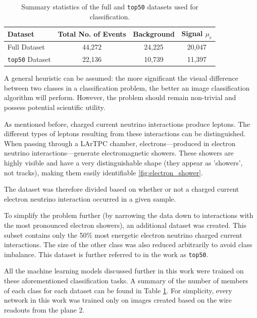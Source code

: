 \documentclass{pracalicmgr}
\begin{document}
\begin{table}[H]
    \centering
    \caption{Summary statistics of the full and \texttt{top50} datasets used for classification.}
    \label{tab:dataset_stats}
    \begin{tabular}{lccc}
        \toprule
        \textbf{Dataset} & \textbf{Total No. of Events} & \textbf{Background} & \textbf{Signal $\mu_e$ } \\
        \midrule
        Full Dataset     & 44,272                 & 24,225 & 20,047 \\
        \texttt{top50} Dataset & 22,136                 & 10,739 & 11,397 \\
        \bottomrule
    \end{tabular}
\end{table}

A general heuristic can be assumed: the more significant the visual difference between two classes in a classification problem, the better an image classification algorithm will perform. However, the problem should remain non-trivial and possess potential scientific utility.

As mentioned before, charged current neutrino interactions produce leptons. The different types of leptons resulting from these interactions can be distinguished. When passing through a LArTPC chamber, electrons—produced in electron neutrino interactions—generate electromagnetic showers. These showers are highly visible and have a very distinguishable shape (they appear as 'showers', not tracks), making them easily identifiable \ref{fig:electron_shower}.

The dataset was therefore divided based on whether or not a charged current electron neutrino interaction occurred in a given sample.

To simplify the problem further (by narrowing the data down to interactions with the most pronounced electron showers), an additional dataset was created. This subset contains only the 50\% most energetic electron neutrino charged current interactions. The size of the other class was also reduced arbitrarily to avoid class imbalance. This dataset is further referred to in the work as \texttt{top50}.

All the machine learning models discussed further in this work were trained on these aforementioned classification tasks. A summary of the number of members of each class for each dataset can be found in Table \ref{tab:dataset_stats}. For simplicity, every network in this work was trained only on images created based on the wire readouts from the plane 2.
\end{document}
